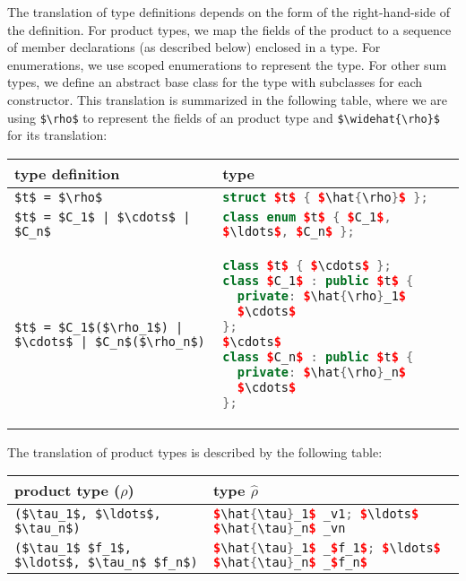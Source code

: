 The translation of type definitions depends on the form of the right-hand-side
of the definition.
For product types, we map the fields of the product to a sequence of \Cplusplus{}
member declarations (as described below) enclosed in a \Cplusplus{}  type.
For enumerations, we use \Cplusplus{} scoped enumerations to represent the type.
For other sum types, we define an abstract base class for the type with subclasses
for each constructor.
This translation is summarized in the following table, where we are using
\lstinline[mathescape=true]@$\rho$@ to represent the fields of an \asdl{}
product type and \lstinline[mathescape=true]@$\widehat{\rho}$@ for its translation:
%
\begin{center}
  \begin{tabular}{|p{2in}|p{3in}|}
    \hline
      \textbf{\asdl{} type definition} &  \textbf{\Cplusplus{} type} \\
    \hline
      \lstinline[language=ASDL,mathescape=true]@$t$ = $\rho$@
        & \lstinline[language=c++,mathescape=true]@struct $t$ { $\hat{\rho}$ };@ \\[0.5em]
      \lstinline[language=ASDL,mathescape=true]@$t$ = $C_1$ | $\cdots$ | $C_n$@
        & \lstinline[language=c++,mathescape=true]@class enum $t$ { $C_1$, $\ldots$, $C_n$ };@ \\[0.5em]
      \lstinline[language=ASDL,mathescape=true]@$t$ = $C_1$($\rho_1$) | $\cdots$ | $C_n$($\rho_n$)@
        &
\vspace*{-1em}
\begin{lstlisting}[language=c++,mathescape=true]
class $t$ { $\cdots$ };
class $C_1$ : public $t$ {
  private: $\hat{\rho}_1$
  $\cdots$
};
$\cdots$
class $C_n$ : public $t$ {
  private: $\hat{\rho}_n$
  $\cdots$
};
\end{lstlisting}%
      \\[0.25em]
    \hline
  \end{tabular}%
\end{center}%

The translation of product types is described by the following table:
%
\begin{center}
  \begin{tabular}{|p{2in}|p{3in}|}
    \hline
      \textbf{\asdl{} product type ($\rho$)} &  \textbf{\Cplusplus{} type $\widehat{\rho}$} \\
    \hline
      \lstinline[language=ASDL,mathescape=true]@($\tau_1$, $\ldots$, $\tau_n$)@
        & \lstinline[language=c++,mathescape=true]@$\hat{\tau}_1$ _v1; $\ldots$ $\hat{\tau}_n$ _vn@ \\[0.5em]
      \lstinline[language=ASDL,mathescape=true]@($\tau_1$ $f_1$, $\ldots$, $\tau_n$ $f_n$)@
        & \lstinline[language=c++,mathescape=true]@$\hat{\tau}_1$ _$f_1$; $\ldots$ $\hat{\tau}_n$ _$f_n$@ \\[0.5em]
    \hline
  \end{tabular}%
\end{center}%

